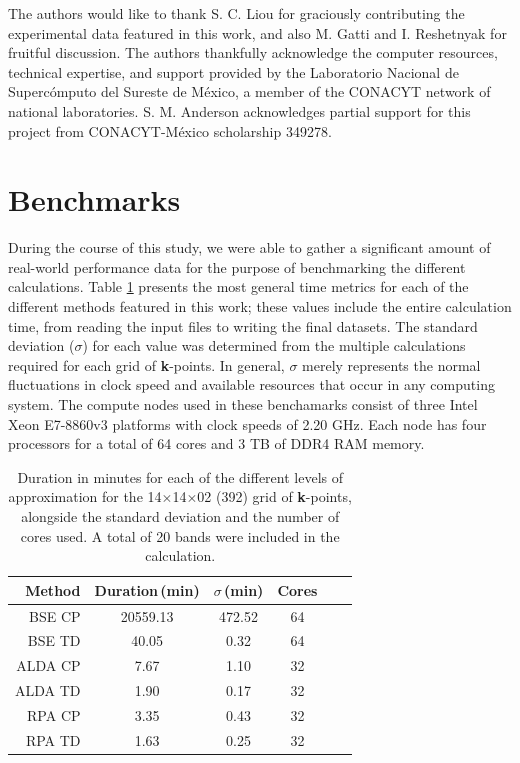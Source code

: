 \documentclass[aps,prb,10pt,showpacs,superscriptaddress,twocolumn,notitlepage]{revtex4-1}
\begin{document}
The authors would like to thank S. C. Liou for graciously contributing the
experimental data featured in this work, and also M. Gatti and I. Reshetnyak for
fruitful discussion. The authors thankfully acknowledge the computer resources,
technical expertise, and support provided by the Laboratorio Nacional de
Superc\'omputo del Sureste de M\'exico, a member of the CONACYT network of
national laboratories. S. M. Anderson acknowledges partial support for this
project from CONACYT-M\'exico scholarship 349278.


\appendix
\section{Benchmarks}\label{sec:bench}

During the course of this study, we were able to gather a significant amount of
real-world performance data for the purpose of benchmarking the different
calculations. Table \ref{tab:times} presents the most general time metrics for
each of the different methods featured in this work; these values include the
entire calculation time, from reading the input files to writing the final
datasets. The standard deviation ($\sigma$) for each value was determined from
the multiple calculations required for each grid of \textbf{k}-points. In
general, $\sigma$ merely represents the normal fluctuations in clock speed and
available resources that occur in any computing system. The compute nodes used
in these benchamarks consist of three Intel Xeon E7-8860v3 platforms with clock
speeds of 2.20 GHz. Each node has four processors for a total of 64 cores and 3
TB of DDR4 RAM memory.

\begin{table}[t]
\caption{Duration in minutes for each of the different levels of approximation
for the 14$\times$14$\times$02 (392) grid of \textbf{k}-points, alongside the
standard deviation and the number of cores used. A total of 20 bands were
included in the calculation.}
\label{tab:times}
\begin{ruledtabular}
\begin{tabular}{ r c c c c c }
Method & Duration\,(min) & $\sigma$\,(min) & Cores\\
\hline
BSE CP  & 20559.13       & 472.52          & 64\\
BSE TD  &    40.05       &   0.32          & 64\\
ALDA CP &     7.67       &   1.10          & 32\\
ALDA TD &     1.90       &   0.17          & 32\\
RPA CP  &     3.35       &   0.43          & 32\\
RPA TD  &     1.63       &   0.25          & 32
\end{tabular}
\end{ruledtabular}
\end{table}
\end{document}
